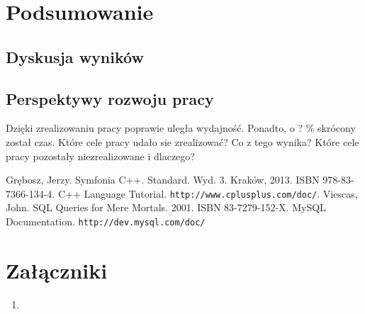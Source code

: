 \documentclass[12pt]{report}
\begin{document}
\chapter{Podsumowanie} \label{podsumowanie}

\section{Dyskusja wyników}

\section{Perspektywy rozwoju pracy} %

Dzięki zrealizowaniu pracy poprawie uległa wydajność. Ponadto, o ? \% skrócony został czas. Które cele pracy udało sie zrealizować? Co z tego wynika? Które cele pracy 
pozostały niezrealizowane i dlaczego? 

\begin{thebibliography}{99}
 Grębosz, Jerzy. Symfonia C++. Standard. Wyd. 3. Kraków, 2013. ISBN 978-83-7366-134-4.
 C++ Language Tutorial. {\tt http://www.cplusplus.com/doc/}.
 Viescas, John. SQL Queries for Mere Mortals. 2001. ISBN 83-7279-152-X.
 MySQL Documentation. {\tt http://dev.mysql.com/doc/}
\end{thebibliography}

\listoffigures

\listoftables

\chapter*{Załączniki}
\begin{enumerate}
\item
\end{enumerate}
\end{document}
